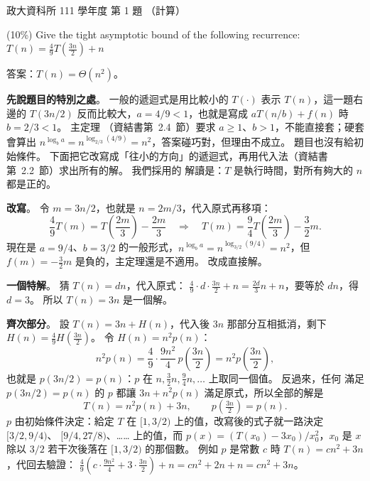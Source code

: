 \begin{pastexam}[label={px:nccu-111-dsa-01}]{政大資科所 111 學年度 第 1 題}
（計算）

(10\%) Give the tight asymptotic bound of the following recurrence: $T(n)=\frac{4}{9}T\left(\frac{3n}{2}\right)+n$
\end{pastexam}

\begin{pastsoln}
答案：$T(n) = \Theta(n^2)$。

\textbf{先說題目的特別之處}。 一般的遞迴式是用比較小的 $T(\cdot)$ 表示 $T(n)$，這一題右邊的
$T(3n/2)$ 反而比較大，$a = 4/9 < 1$，也就是寫成 $aT(n/b) + f(n)$ 時 $b = 2/3 < 1$。 主定理
（資結書第~2.4~節）要求 $a \ge 1$、$b > 1$，不能直接套；硬套會算出
$n^{\log_b a} = n^{\log_{2/3}(4/9)} = n^2$，答案碰巧對，但理由不成立。 題目也沒有給初始條件。
下面把它改寫成「往小的方向」的遞迴式，再用代入法（資結書第~2.2~節）求出所有的解。 我們採用的
解讀是：$T$ 是執行時間，對所有夠大的 $n$ 都是正的。

\textbf{改寫}。 令 $m = 3n/2$，也就是 $n = 2m/3$，代入原式再移項：
\[
\frac{4}{9}T(m) = T\!\left(\frac{2m}{3}\right) - \frac{2m}{3}
\quad\Longrightarrow\quad
T(m) = \frac{9}{4}T\!\left(\frac{2m}{3}\right) - \frac{3}{2}m .
\]
現在是 $a = 9/4$、$b = 3/2$ 的一般形式，$n^{\log_b a} = n^{\log_{3/2}(9/4)} = n^2$，但
$f(m) = -\frac{3}{2}m$ 是負的，主定理還是不適用。 改成直接解。

\textbf{一個特解}。 猜 $T(n) = dn$，代入原式：
$\frac{4}{9} \cdot d \cdot \frac{3n}{2} + n = \frac{2d}{3}n + n$，要等於 $dn$，得 $d = 3$。 所以
$T(n) = 3n$ 是一個解。

\textbf{齊次部分}。 設 $T(n) = 3n + H(n)$，代入後 $3n$ 那部分互相抵消，剩下
$H(n) = \frac{4}{9}H\!\left(\frac{3n}{2}\right)$。 令 $H(n) = n^2 p(n)$：
\[
n^2 p(n) = \frac{4}{9} \cdot \frac{9n^2}{4}\, p\!\left(\frac{3n}{2}\right) = n^2 p\!\left(\frac{3n}{2}\right),
\]
也就是 $p(3n/2) = p(n)$：$p$ 在 $n, \frac{3}{2}n, \frac{9}{4}n, \ldots$ 上取同一個值。 反過來，任何
滿足 $p(3n/2) = p(n)$ 的 $p$ 都讓 $3n + n^2 p(n)$ 滿足原式，所以全部的解是
\[
T(n) = n^2 p(n) + 3n, \qquad p\!\left(\tfrac{3n}{2}\right) = p(n).
\]
$p$ 由初始條件決定：給定 $T$ 在 $[1, 3/2)$ 上的值，改寫後的式子就一路決定 $[3/2, 9/4)$、
$[9/4, 27/8)$、…… 上的值，而 $p(x) = (T(x_0) - 3x_0)/x_0^2$，$x_0$ 是 $x$ 除以 $3/2$ 若干次後落在
$[1, 3/2)$ 的那個數。 例如 $p$ 是常數 $c$ 時 $T(n) = cn^2 + 3n$，代回去驗證：
$\frac{4}{9}\left(c \cdot \frac{9n^2}{4} + 3 \cdot \frac{3n}{2}\right) + n = cn^2 + 2n + n = cn^2 + 3n$。


\end{pastsoln}
